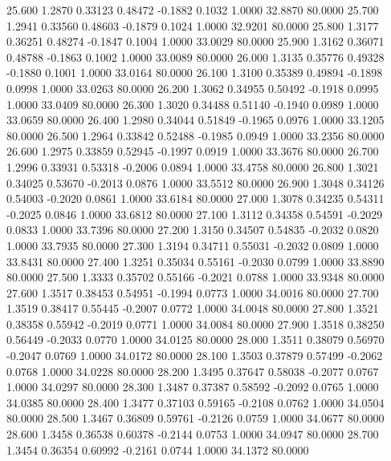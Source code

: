   25.600   1.2870   0.33123   0.48472  -0.1882   0.1032   1.0000  32.8870  80.0000
  25.700   1.2941   0.33560   0.48603  -0.1879   0.1024   1.0000  32.9201  80.0000
  25.800   1.3177   0.36251   0.48274  -0.1847   0.1004   1.0000  33.0029  80.0000
  25.900   1.3162   0.36071   0.48788  -0.1863   0.1002   1.0000  33.0089  80.0000
  26.000   1.3135   0.35776   0.49328  -0.1880   0.1001   1.0000  33.0164  80.0000
  26.100   1.3100   0.35389   0.49894  -0.1898   0.0998   1.0000  33.0263  80.0000
  26.200   1.3062   0.34955   0.50492  -0.1918   0.0995   1.0000  33.0409  80.0000
  26.300   1.3020   0.34488   0.51140  -0.1940   0.0989   1.0000  33.0659  80.0000
  26.400   1.2980   0.34044   0.51849  -0.1965   0.0976   1.0000  33.1205  80.0000
  26.500   1.2964   0.33842   0.52488  -0.1985   0.0949   1.0000  33.2356  80.0000
  26.600   1.2975   0.33859   0.52945  -0.1997   0.0919   1.0000  33.3676  80.0000
  26.700   1.2996   0.33931   0.53318  -0.2006   0.0894   1.0000  33.4758  80.0000
  26.800   1.3021   0.34025   0.53670  -0.2013   0.0876   1.0000  33.5512  80.0000
  26.900   1.3048   0.34126   0.54003  -0.2020   0.0861   1.0000  33.6184  80.0000
  27.000   1.3078   0.34235   0.54311  -0.2025   0.0846   1.0000  33.6812  80.0000
  27.100   1.3112   0.34358   0.54591  -0.2029   0.0833   1.0000  33.7396  80.0000
  27.200   1.3150   0.34507   0.54835  -0.2032   0.0820   1.0000  33.7935  80.0000
  27.300   1.3194   0.34711   0.55031  -0.2032   0.0809   1.0000  33.8431  80.0000
  27.400   1.3251   0.35034   0.55161  -0.2030   0.0799   1.0000  33.8890  80.0000
  27.500   1.3333   0.35702   0.55166  -0.2021   0.0788   1.0000  33.9348  80.0000
  27.600   1.3517   0.38453   0.54951  -0.1994   0.0773   1.0000  34.0016  80.0000
  27.700   1.3519   0.38417   0.55445  -0.2007   0.0772   1.0000  34.0048  80.0000
  27.800   1.3521   0.38358   0.55942  -0.2019   0.0771   1.0000  34.0084  80.0000
  27.900   1.3518   0.38250   0.56449  -0.2033   0.0770   1.0000  34.0125  80.0000
  28.000   1.3511   0.38079   0.56970  -0.2047   0.0769   1.0000  34.0172  80.0000
  28.100   1.3503   0.37879   0.57499  -0.2062   0.0768   1.0000  34.0228  80.0000
  28.200   1.3495   0.37647   0.58038  -0.2077   0.0767   1.0000  34.0297  80.0000
  28.300   1.3487   0.37387   0.58592  -0.2092   0.0765   1.0000  34.0385  80.0000
  28.400   1.3477   0.37103   0.59165  -0.2108   0.0762   1.0000  34.0504  80.0000
  28.500   1.3467   0.36809   0.59761  -0.2126   0.0759   1.0000  34.0677  80.0000
  28.600   1.3458   0.36538   0.60378  -0.2144   0.0753   1.0000  34.0947  80.0000
  28.700   1.3454   0.36354   0.60992  -0.2161   0.0744   1.0000  34.1372  80.0000
